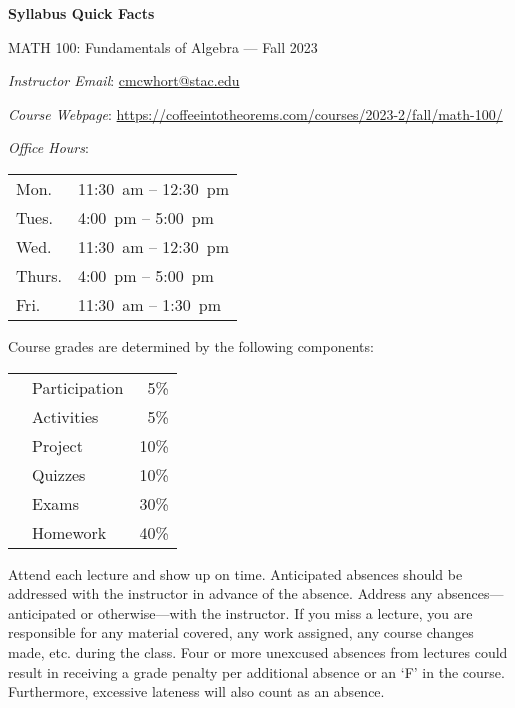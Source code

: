 \documentclass[11pt,letterpaper]{article}
\begin{document}
\begin{center} 
\bfseries
\color{stacred}
\LARGE Syllabus Quick Facts \par\vspace{0.2\baselineskip}
\Large MATH 100: Fundamentals of Algebra --- Fall 2023 
\end{center} \pspace


\hspace{0.53cm} {\itshape Instructor Email}: \href{mailto:cmcwhort@stac.edu}{cmcwhort@stac.edu} \par
\hspace{0.53cm} {\itshape Course Webpage}: \href{https://coffeeintotheorems.com/courses/2023-2/fall/math-100/}{https://coffeeintotheorems.com/courses/2023-2/fall/math-100/} \par
\hspace{0.53cm} {\itshape Office Hours}: 	\par \vspace{-0.3cm}
	\begin{table}[!ht]
	\centering
	\begin{tabular}{l || l}
	Mon. & 11:30~am -- 12:30~pm \\
	Tues. & 4:00~pm -- 5:00~pm \\
	Wed. & 11:30~am -- 12:30~pm \\
	Thurs. & 4:00~pm -- 5:00~pm \\
	Fri. & 11:30~am -- 1:30~pm
	\end{tabular}
	\end{table}


Course grades are determined by the following components: \par \vspace{-0.3cm}
	\begin{table}[!ht]
        \begin{tabular}{clr}
	& Participation & 5\% \\
        & Activities & 5\% \\
	& Project & 10\% \\
	& Quizzes & 10\% \\
	& Exams & 30\% \\
	& Homework & 40\% 
        \end{tabular} 
        \end{table}


Attend each lecture and show up on time. Anticipated absences should be addressed with the instructor in advance of the absence. Address any absences---anticipated or otherwise---with the instructor. If you miss a lecture, you are responsible for any material covered, any work assigned, any course changes made, etc. during the class. Four or more unexcused absences from lectures could result in receiving a grade penalty per additional absence or an `F' in the course. Furthermore, excessive lateness will also count as an absence. \pspace
\end{document}
